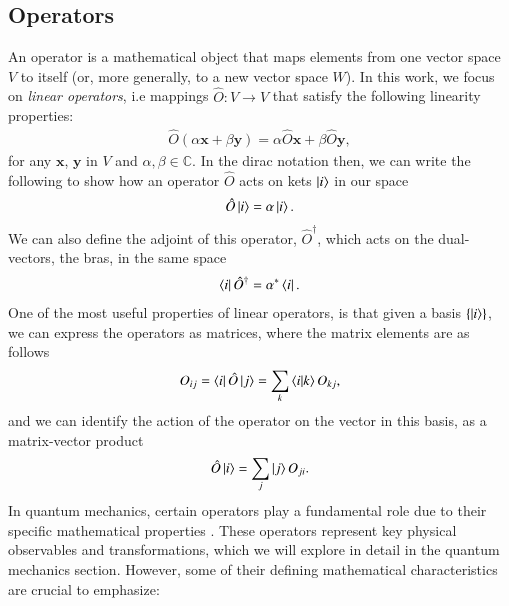 \documentclass{subfiles}
\begin{document}
\subsection{Operators}
An operator is a mathematical object that maps elements from one vector space $V$ to itself (or, more generally, to a new vector space $W$)\cite{berera2021quantum}. In this work, we focus on \emph{linear operators}, i.e mappings $\hat O: V \rightarrow V$ that satisfy the following linearity properties:
\begin{align*}
    \hat O(\alpha \mathbf{x} + \beta\mathbf{y}) = \alpha \hat O\mathbf{x} + \beta \hat O\mathbf{y},
\end{align*}
for any $\mathbf{x}$, $\mathbf{y}$ in $V$ and $\alpha, \beta\in \mathbb{C}$. In the dirac notation then, we can write the following to show how an operator $\hat O$ acts on kets $\ket{i}$ in our space
\begin{align*}
    \hat O\ket{i} = \alpha \ket{i}.
\end{align*}
We can also define the adjoint of this operator, $\hat O^\dagger$, which acts on the dual-vectors, the bras, in the same space
\begin{align*}
    \bra{i}\hat O^\dagger = \alpha^* \bra{i}.
\end{align*}
One of the most useful properties of linear operators, is that given a basis $\{\ket{i}\}$, we can express the operators as matrices, where the matrix elements are as follows
\begin{align*}
    O_{ij} = \bra{i}\hat O\ket{j} = \sum_k\braket{i|k}O_{kj},
\end{align*}
and we can identify the action of the operator on the vector in this basis, as a matrix-vector product
\begin{align*}
    \hat O\ket{i} = \sum_j \ket{j}O_{ji}.
\end{align*}
In quantum mechanics, certain operators play a fundamental role due to their specific mathematical properties \cite{griffiths2018introduction, berera2021quantum}. These operators represent key physical observables and transformations, which we will explore in detail in the quantum mechanics section. However, some of their defining mathematical characteristics are crucial to emphasize:
\end{document}
